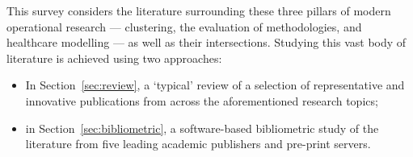 This survey considers the literature surrounding these three pillars of
modern operational research --- clustering, the evaluation of methodologies, and
healthcare modelling --- as well as their intersections. Studying this vast body
of literature is achieved using two approaches:

\begin{itemize}
    \item In Section~\ref{sec:review}, a `typical' review of a selection of
        representative and innovative publications from across the
        aforementioned research topics;
    \item in Section~\ref{sec:bibliometric}, a software-based bibliometric study
        of the literature from five leading academic publishers and pre-print
        servers.
\end{itemize}


